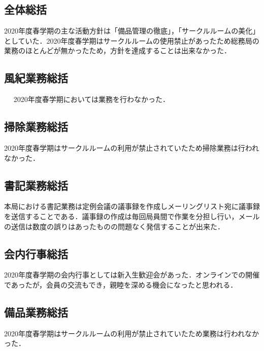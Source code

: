 \subsection*{全体総括}
2020年度春学期の主な活動方針は「備品管理の徹底」，「サークルルームの美化」としていた．2020年度春学期はサークルルームの使用禁止があったため総務局の業務のほとんどが無かったため，方針を達成することは出来なかった．

\subsection*{風紀業務総括}　
2020年度春学期においては業務を行わなかった．

\subsection*{掃除業務総括}
2020年度春学期はサークルルームの利用が禁止されていたため掃除業務は行われなかった．

\subsection*{書記業務総括}
本局における書記業務は定例会議の議事録を作成しメーリングリスト宛に議事録を送信することである．議事録の作成は毎回局員間で作業を分担し行い，メールの送信は数度の誤りはあったものの問題なく発信することが出来た．

\subsection*{会内行事総括}
2020年度春学期の会内行事としては新入生歓迎会があった．オンラインでの開催であったが，会員の交流もでき，親睦を深める機会になったと思われる．

\subsection*{備品業務総括}
2020年度春学期はサークルルームの利用が禁止されていたため業務は行われなかった．


